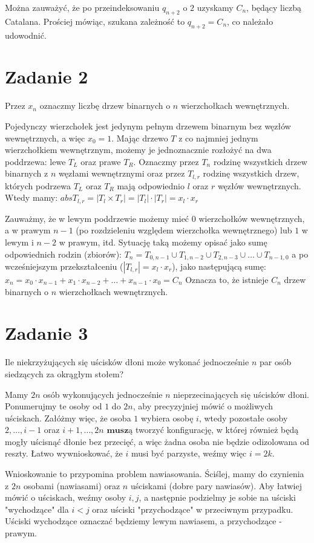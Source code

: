 \documentclass[12pt]{article}
\newcommand{\abs}[1]{\left| #1 \right|}					%
\begin{document}
Można zauważyć, że po przeindeksowaniu $q_{n+2}$ o $2$ uzyskamy $C_n$, będący liczbą Catalana. Prościej mówiąc, szukana zależność to $q_{n+2} = C_n$, co należało udowodnić.


\section{Zadanie 2}
Przez $x_n$ oznaczmy liczbę drzew binarnych o $n$ wierzchołkach wewnętrznych.

Pojedynczy wierzchołek jest jedynym pełnym drzewem binarnym bez węzłów wewnętrznych, a więc $x_0 = 1$. Mając drzewo $T$ z co najmniej jednym wierzchołkiem wewnętrznym, możemy je jednoznacznie rozłożyć na dwa poddrzewa: lewe $T_L$ oraz prawe $T_R$. Oznaczmy przez $T_n$ rodzinę wszystkich drzew binarnych z $n$ węzłami wewnętrznymi oraz przez $T_{l, r}$ rodzinę wszystkich drzew, których podrzewa $T_L$ oraz $T_R$ mają odpowiednio $l$ oraz $r$ węzłów wewnętrznych. Wtedy mamy:
$abs{T_{l, r}} = \abs{T_l \times T_r} = \abs{T_l} \cdot \abs{T_r} = x_l \cdot x_r$

Zauważmy, że w lewym poddrzewie możemy mieć $0$ wierzchołków wewnętrznych, a w prawym $n-1$ (po rozdzieleniu względem wierzchołka wewnętrznego) lub $1$ w lewym i $n-2$ w prawym, itd. Sytuację taką możemy opisać jako sumę odpowiednich rodzin (zbiorów):
$T_n = T_{0, n - 1} \cup T_{1, n - 2} \cup T_{2, n - 3} \cup \ldots \cup T_{n-1, 0}$
a po wcześniejszym przekształceniu ($\abs{T_{l, r}} = x_l \cdot x_r$), jako następującą sumę:
$x_n = x_0 \cdot x_{n-1} + x_1 \cdot x_{n-2} + \ldots + x_{n-1} \cdot x_0 = C_n$
Oznacza to, że istnieje $C_n$ drzew binarnych o $n$ wierzchołkach wewnętrznych.
\section{Zadanie 3}
Ile niekrzyżujących się uścisków dłoni może wykonać jednocześnie $n$ par osób siedzących za okrągłym stołem? 

Mamy $2n$ osób wykonujących jednocześnie $n$ nieprzecinających się uścisków dłoni. Ponumerujmy te osoby od $1$ do $2n$, aby precyzyjniej mówić o możliwych uściskach. Załóżmy więc, że osoba $1$ wybiera osobę $i$, wtedy pozostałe osoby $2, \ldots, i - 1$ oraz $i + 1, \ldots, 2n$ $\textbf{muszą}$ tworzyć konfigurację, w której  również będą mogły uścisnąć dłonie bez przecięć, a więc żadna osoba nie będzie odizolowana od reszty. Łatwo wywnioskować, że $i$ musi być parzyste, weźmy więc $i = 2k$. 

Wnioskowanie to przypomina problem nawiasowania. Ściślej, mamy do czynienia z $2n$ osobami (nawiasami) oraz $n$ uściskami (dobre pary nawiasów). Aby łatwiej mówić o uściskach, weźmy osoby $i, j$, a następnie podzielmy je sobie na uściski "wychodzące" dla $i < j$ oraz uściski "przychodzące" w przeciwnym przypadku. Uściski wychodzące oznaczać będziemy lewym nawiasem, a przychodzące - prawym. 
\end{document}
